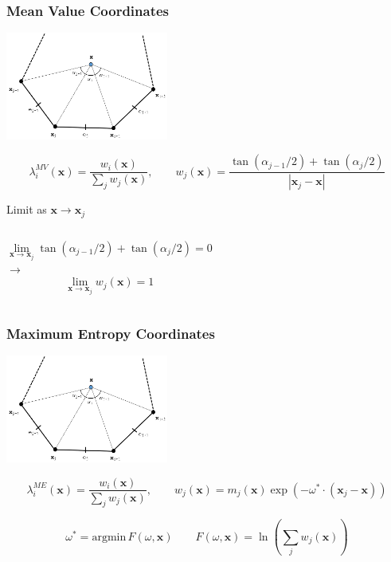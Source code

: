 \documentclass[compress,10pt]{beamer}
\renewcommand{\vec}[1]{\mathbf{#1}}
\begin{document}
\begin{frame}[t]\frametitle{Mean Value Coordinates}
\centering
\includegraphics[width=0.40\textwidth]{images/ref_polygon.png}
\vspace{0.3cm}
\begin{block}{}
\begin{equation*}
\lambda_i^{MV} (\vec{x}) = \frac{w_i (\vec{x}) }{ \sum_{j} w_j (\vec{x})}, \qquad w_j (\vec{x}) = \frac{\tan(\alpha_{j-1} / 2) + \tan(\alpha_j / 2)}{|\vec{x}_j - \vec{x}|}
\end{equation*}
\end{block}
\begin{block}{Limit as $\vec{x} \rightarrow \vec{x}_j$}
\vspace{-0.25cm}
\begin{columns}
\centering
\begin{equation*}
\lim_{\vec{x} \rightarrow \vec{x}_j} \tan(\alpha_{j-1} / 2) + \tan(\alpha_j / 2) = 0
\end{equation*}
\centering
$\longrightarrow$
\centering
\begin{equation*}
\lim_{\vec{x} \rightarrow \vec{x}_j}  w_j (\vec{x}) = 1
\end{equation*}
\end{columns}
\end{block}
\end{frame}
\begin{frame}[t]\frametitle{Maximum Entropy Coordinates}
\centering
\includegraphics[width=0.40\textwidth]{images/ref_polygon.png}
\vspace{0.3cm}
\begin{block}{}
\begin{equation*}
\lambda_i^{ME} (\vec{x}) = \frac{w_i (\vec{x}) }{ \sum_{j} w_j (\vec{x})}, \qquad w_j (\vec{x}) = m_j(\vec{x}) \exp(- \omega^* \cdot (\vec{x}_j - \vec{x}))
\end{equation*}
\end{block}
\begin{block}{}
\begin{equation*}
\omega^* = \text{argmin} \, F(\omega, \vec{x})  \qquad F(\omega, \vec{x}) = \ln \left(  \sum_j w_j (\vec{x})  \right)
\end{equation*}
\end{block}
\end{frame}
\end{document}
